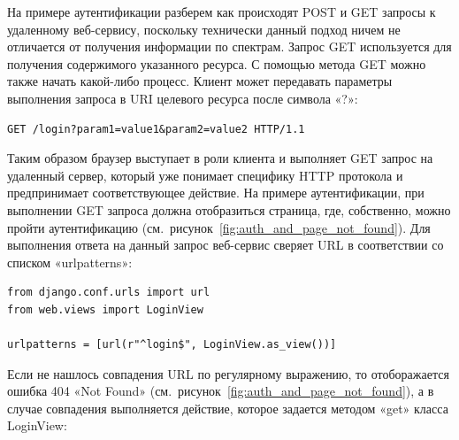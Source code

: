 На примере аутентификации разберем как происходят POST и GET запросы к удаленному веб-сервису, поскольку технически
данный подход ничем не отличается от получения информации по спектрам. Запрос GET используется для получения
содержимого указанного ресурса. С помощью метода GET можно также начать какой-либо процесс. Клиент может передавать
параметры выполнения запроса в URI целевого ресурса после символа «?»:
\begin{verbatim}
GET /login?param1=value1&param2=value2 HTTP/1.1
\end{verbatim}
Таким образом браузер выступает в роли клиента и выполняет GET запрос на удаленный сервер, который уже понимает специфику
HTTP протокола и предпринимает соответствующее действие. На примере аутентификации, при выполнении GET запроса должна
отобразиться страница, где, собственно, можно пройти аутентификацию (см.~рисунок~\ref{fig:auth_and_page_not_found}).
Для выполнения ответа на данный запрос веб-сервис сверяет URL в соответствии со списком «urlpatterns»:
\begin{lstlisting}[style=py]
from django.conf.urls import url
from web.views import LoginView

urlpatterns = [url(r"^login$", LoginView.as_view())]
\end{lstlisting}
Если не нашлось совпадения URL по регулярному выражению, то отоборажается ошибка 404 «Not Found» (см.~рисунок~\ref{fig:auth_and_page_not_found}),
а в случае совпадения выполняется действие, которое задается методом «get» класса LoginView:
